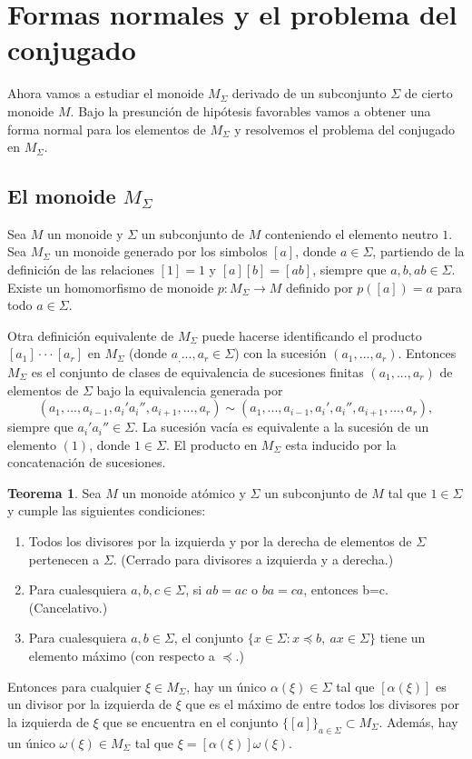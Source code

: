\documentclass[12pt]{book}
\theoremstyle{definition}
\newtheorem{teor}{Teorema}[section]
\begin{document}
\section{Formas normales y el problema del conjugado}

Ahora vamos a estudiar el monoide $M_\Sigma$ derivado de un subconjunto $\Sigma$ de cierto monoide $M$. Bajo la presunción de hipótesis favorables vamos a obtener una forma normal para los elementos de $M_\Sigma$ y resolvemos el problema del conjugado en $M_\Sigma$.

\subsection{El monoide $M_\Sigma$} 

Sea $M$ un monoide y $\Sigma$ un subconjunto de $M$ conteniendo el elemento neutro $1$. Sea $M_\Sigma$ un monoide generado por los simbolos $[a]$, donde $a\in \Sigma$, partiendo de la definición de las relaciones $[1]=1$ y $[a][b]=[ab]$, siempre que $a,b,ab\in\Sigma$. Existe un homomorfismo de monoide $p:M_\Sigma\rightarrow M$ definido por $p([a])=a$ para todo $a\in\Sigma$.

Otra definición equivalente de $M_\Sigma$ puede hacerse identificando el producto $[a_1]\cdot\cdot\cdot[a_r]$ en $M_\Sigma$ (donde $a_,...,a_r\in \Sigma$) con la sucesión $(a_1,...,a_r)$. Entonces $M_\Sigma$ es el conjunto de clases de equivalencia de sucesiones finitas $(a_1,...,a_r)$ de elementos de $\Sigma$ bajo la equivalencia generada por
$$(a_1,...,a_{i-1}, a_i'a_i'',a_{i+1},...,a_r)\sim (a_1,...,a_{i-1}, a_i',a_i'',a_{i+1},...,a_r),$$
siempre que $a_i'a_i''\in\Sigma$. La sucesión vacía es equivalente a la sucesión de un elemento $(1)$, donde $1\in\Sigma$. El producto en $M_\Sigma$ esta inducido por la concatenación de sucesiones.


\begin{teor}
\label{teor:monoi_deriv}
Sea $M$ un monoide atómico y $\Sigma$ un subconjunto de $M$ tal que $1\in \Sigma$ y cumple las siguientes condiciones:
\begin{enumerate}
\item Todos los divisores por la izquierda y por la derecha de elementos de $\Sigma$ pertenecen a $\Sigma$. (Cerrado para divisores a izquierda y a derecha.)
\item Para cualesquiera $a,b,c\in \Sigma$, si $ab=ac$ o $ba=ca$, entonces b=c. (Cancelativo.)
\item Para cualesquiera $a,b\in \Sigma$, el conjunto $\{x\in\Sigma:x\preceq b,\ ax\in\Sigma\}$ tiene un elemento máximo (con respecto a $\preceq$.)
\end{enumerate}
Entonces para cualquier $\xi\in M_\Sigma$, hay un único $\alpha(\xi)\in\Sigma$ tal que $[\alpha(\xi)]$ es un divisor por la izquierda de $\xi$ que es el máximo de entre todos los divisores por la izquierda de $\xi$ que se encuentra en el conjunto $\{[a]\}_{a\in\Sigma}\subset M_\Sigma$. Además, hay un único $\omega(\xi)\in M_\Sigma$ tal que $\xi=[\alpha(\xi)]\omega(\xi)$.
\end{teor}
\end{document}
